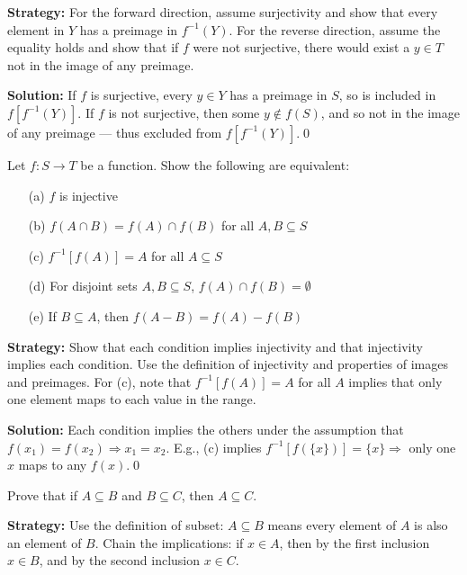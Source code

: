 \noindent\textbf{Strategy:} For the forward direction, assume surjectivity and show that every element in $Y$ has a preimage in $f^{-1}(Y)$. For the reverse direction, assume the equality holds and show that if $f$ were not surjective, there would exist a $y \in T$ not in the image of any preimage.

\noindent\bigskip\noindent\textbf{Solution:}  
If \( f \) is surjective, every \( y \in Y \) has a preimage in \( S \), so is included in \( f[f^{-1}(Y)] \).  
If \( f \) is not surjective, then some \( y \notin f(S) \), and so not in the image of any preimage — thus excluded from \( f[f^{-1}(Y)] \).\qed



\begin{problembox}
Let \( f: S \to T \) be a function. Show the following are equivalent:
\begin{itemize}
\item[(a)] \( f \) is injective
\item[(b)] \( f(A \cap B) = f(A) \cap f(B) \) for all \( A, B \subseteq S \)
\item[(c)] \( f^{-1}[f(A)] = A \) for all \( A \subseteq S \)
\item[(d)] For disjoint sets \( A, B \subseteq S \), \( f(A) \cap f(B) = \emptyset \)
\item[(e)] If \( B \subseteq A \), then \( f(A - B) = f(A) - f(B) \)
\end{itemize}
\end{problembox}

\noindent\textbf{Strategy:} Show that each condition implies injectivity and that injectivity implies each condition. Use the definition of injectivity and properties of images and preimages. For (c), note that $f^{-1}[f(A)] = A$ for all $A$ implies that only one element maps to each value in the range.

\noindent\bigskip\noindent\textbf{Solution:}  
Each condition implies the others under the assumption that \( f(x_1) = f(x_2) \Rightarrow x_1 = x_2 \).  
E.g., (c) implies \( f^{-1}[f(\{x\})] = \{x\} \Rightarrow \) only one \( x \) maps to any \( f(x) \).\qed



\begin{problembox}
Prove that if \( A \subseteq B \) and \( B \subseteq C \), then \( A \subseteq C \).
\end{problembox}

\noindent\textbf{Strategy:} Use the definition of subset: $A \subseteq B$ means every element of $A$ is also an element of $B$. Chain the implications: if $x \in A$, then by the first inclusion $x \in B$, and by the second inclusion $x \in C$.

